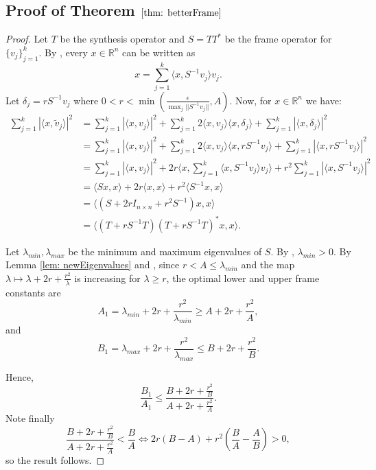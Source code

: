 \documentclass[11pt, reqno]{amsart}
\providecommand{\wt}{\widetilde}
\providecommand{\R}{\mathbb R}
\numberwithin{equation}{section}
\begin{document}
\subsection{Proof of Theorem $\ref{thm: betterFrame}$}
\begin{proof}

    Let $T$ be the synthesis operator and $S=TT^*$ be the frame operator for $\{v_j\}_{j=1}^k$. By \cite[Proposition 3.19]{Han}, every $x\in\R^n$ can be written as $$x=\sum_{j=1}^k \langle x, S^{-1}v_j\rangle v_j.$$ Let $\delta_j = rS^{-1}v_j$ where $0<r< \min\left(\frac{\epsilon}{\max_{j}||S^{-1}v_j||}, A\right)$.
     Now, for $x\in \R^n$ we have:
    \begin{align*}
        \sum_{j=1}^k|\langle x, \wt{v}_j \rangle|^2 &= \sum_{j=1}^k|\langle x, v_j \rangle|^2+\sum_{j=1}^k 2\langle x,v_j\rangle\langle x, \delta_j\rangle +\sum_{j=1}^k|\langle x, \delta_j\rangle|^2\\
        &=\sum_{j=1}^k|\langle x, v_j \rangle|^2+\sum_{j=1}^k2\langle x,v_j\rangle\langle x, rS^{-1}v_j\rangle +\sum_{j=1}^k|\langle x, rS^{-1}v_j\rangle|^2\\
        &= \sum_{j=1}^k|\langle x, v_j \rangle|^2+2r\langle x, \sum_{j=1}^k\langle x,  S^{-1}v_j\rangle v_j\rangle +r^2\sum_{j=1}^k|\langle x, S^{-1}v_j\rangle|^2\\
        &=\langle Sx, x\rangle +2r\langle x, x\rangle +r^2\langle S^{-1}x, x\rangle \\
        &=\langle (S+2rI_{n\times n}+r^2S^{-1})x, x\rangle\\
        &= \langle (T+rS^{-1}T)(T+rS^{-1}T)^*x, x\rangle. 
    \end{align*}



    Let $\lambda_{min},\lambda_{max}$ be the minimum and maximum eigenvalues of $S$. By \cite[Proposition 3.27]{Han}, $\lambda_{min}>0$. By Lemma \ref{lem: newEigenvalues} and \cite[Proposition 3.27]{Han}, since $r<A\le \lambda_{min}$ and the map $\lambda\mapsto \lambda+2r+\frac{r^2}{\lambda}$ is increasing for $\lambda\ge r$, the optimal lower and upper frame constants are
    $$A_1=\lambda_{min}+2r+\frac{r^2}{\lambda_{min}}\ge A+2r+\frac{r^2}{A},$$ and  $$B_1=\lambda_{max}+2r+\frac{r^2}{\lambda_{max}}\le B+2r+\frac{r^2}{B}.$$
    

    

    \noindent Hence, $$\frac{B_1}{A_1}\le \frac{B+2r+\frac{r^2}{B}}{A+2r+\frac{r^2}{A}}.$$ Note finally $$\frac{B+2r+\frac{r^2}{B}}{A+2r+\frac{r^2}{A}}<\frac{B}{A} \iff 2r(B-A)+r^2\left(\frac{B}{A}-\frac{A}{B}\right)>0,$$ so the result follows.
\end{proof}
\end{document}
